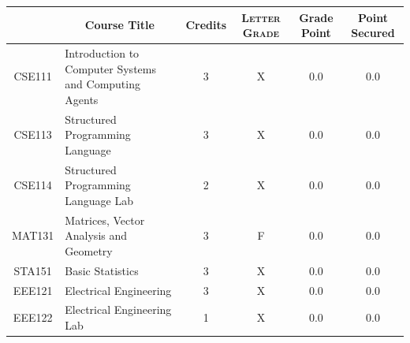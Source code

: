 \documentclass[11pt]{article}
\newcommand*{\numtwo}[1]{\pgfmathprintnumber[
                    fixed, precision=2, fixed zerofill=true]{#1}}
\begin{document}
                \begin{center}
                    \renewcommand{\arraystretch}{1.08}
                    
                \begin{tabular}{|c|l|c|>{\scshape}c|c|c|}
                \hline  \rule[-1ex]{0pt}{3.5ex} {\centering{\bf Course Code}} &  \multicolumn{1}{c|}{\textbf{Course Title}}  & {\bf Credits} & {\bf Letter Grade} & {\bf Grade Point} & {\bf Point Secured}  \\ 
                \hline   CSE111 &  Introduction to Computer Systems and Computing Agents		 & 3 & X & 0.0 & 0.0 \\ %
                \hline   CSE113 &  Structured Programming Language		 & 3 & X & 0.0 & 0.0 \\ %
                \hline   CSE114 &  Structured Programming Language Lab		 & 2 & X & 0.0 & 0.0 \\ %
                \hline   MAT131 &  Matrices, Vector Analysis and Geometry		 & 3 & F & 0.0 & 0.0 \\ %
                \hline   STA151 &  Basic Statistics		 & 3 & X & 0.0 & 0.0 \\ %
                \hline   EEE121 &  Electrical Engineering		 & 3 & X & 0.0 & 0.0 \\ %
                \hline   EEE122 &  Electrical Engineering Lab		 & 1 & X & 0.0 & 0.0 \\ %

\hline                %
                \end{tabular}
                \end{center}
                \renewcommand{\arraystretch}{1.03}
\end{document}
